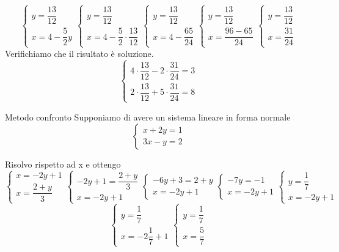 \[
\begin{cases}
y=\dfrac{13}{12}\\
x=4-\dfrac{5}{2}y
\end{cases}
\begin{cases}
y=\dfrac{13}{12}\\
x=4-\dfrac{5}{2}\cdot\dfrac{13}{12}
\end{cases}
\begin{cases}
y=\dfrac{13}{12}\\
x=4-\dfrac{65}{24}
\end{cases}
\begin{cases}
y=\dfrac{13}{12}\\
x=\dfrac{96-65}{24}
\end{cases}
\begin{cases}
y=\dfrac{13}{12}\\
x=\dfrac{31}{24}
\end{cases}
\]
Verifichiamo che il risultato è soluzione. 
\[
\begin{cases}
4\cdot\dfrac{13}{12}-2\cdot\dfrac{31}{24}=3\\
2\cdot\dfrac{13}{12}+5\cdot\dfrac{31}{24}=8
\end{cases}
\]
 \begin{esempiot}{Metodo confronto}{}                  
Supponiamo di avere un sistema lineare in forma normale
\[
\begin{cases}
	x+2y=1\\
	3x-y=2
\end{cases}
\]
\end{esempiot}
Risolvo rispetto ad x e ottengo
\[ 
\begin{cases}
	x=-2y+1\\
	x=\dfrac{2+y}{3}
\end{cases}
\begin{cases}
	-2y+1=\dfrac{2+y}{3}\\
		x=-2y+1
\end{cases}
\begin{cases}
	-6y+3=2+y\\
	x=-2y+1
\end{cases}
\begin{cases}
	-7y=-1\\
	x=-2y+1
\end{cases}
\begin{cases}
	y=\dfrac{1}{7}\\
	x=-2y+1
\end{cases}
\]
\[
\begin{cases}
	y=\dfrac{1}{7}\\
	x=-2\dfrac{1}{7}+1
\end{cases}
\begin{cases}
	y=\dfrac{1}{7}\\
	x=\dfrac{5}{7}
\end{cases}
\]


